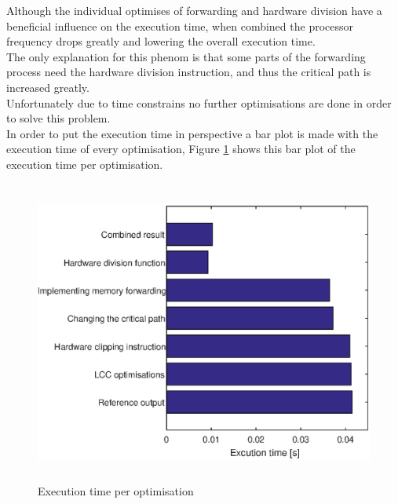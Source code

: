 \documentclass[10pt]{article}
\begin{document}
Although the individual optimises of forwarding and hardware division have a beneficial influence on the execution time, when combined the processor frequency drops greatly and lowering the overall execution time.\\
The only explanation for this phenom is that some parts of the forwarding process need the hardware division instruction, and thus the critical path is increased greatly. \\
Unfortunately due to time constrains no further optimisations are done in order to solve this problem.\\
In order to put the execution time in perspective a bar plot is made with the execution time of every optimisation, Figure \ref{fig:ex} shows this bar plot of the execution time per optimisation.\\%


\begin{figure}[H]
    \centering
    \includegraphics[height = 10cm]{image2.eps}
    \caption{Execution time per optimisation}
    \label{fig:ex}
\end{figure}
\end{document}
